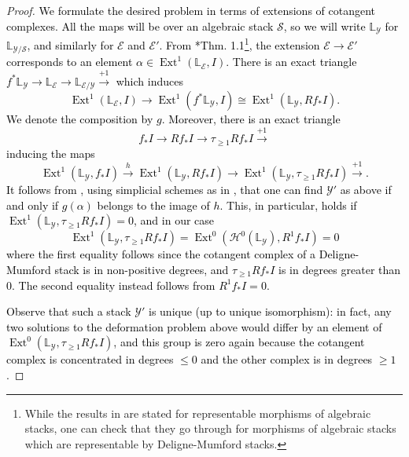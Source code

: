 \documentclass{amsart}
\newcommand{\bL}{\mathbb{L}}
\newcommand{\cE}{\mathcal{E}}
\newcommand{\cH}{\mathcal{H}}
\newcommand{\cS}{\mathcal{S}}
\newcommand{\cY}{\mathcal{Y}}
\newcommand{\E}{\operatorname{Ext}}
\theoremstyle{definition}
\begin{document}
\begin{proof}%
\textcolor{black}{ We formulate the desired problem in terms of extensions of cotangent complexes. All the maps will be over an algebraic stack $\cS$, so we will write $\bL_\cY$ for $\bL_{\cY/\cS}$, and similarly for $\cE$ and $\cE'$. From \cite{ols06}*{Thm. 1.1}\footnote{While the results in \cite{ols06} are stated for representable morphisms of algebraic stacks, one can check that they go through for morphisms of algebraic stacks which are representable by Deligne-Mumford stacks.},
the extension $\cE\to \cE'$ corresponds to an element $\alpha\in\E^1(\bL_{\cE}, I).$ There is an exact triangle 
     $f^*\bL_{\cY}\to \bL_{\cE}\to \bL_{\cE/\cY}\xrightarrow{+1}$
     which induces
     $$\E^1(\bL_{\cE},I)\to \E^1(f^*\bL_{\cY},I)\cong \E^1(\bL_{\cY},Rf_*I). $$}
     \textcolor{black}{We denote the composition by $g$.
        Moreover, there is an exact triangle
    $$f_*I\to Rf_*I\to \tau_{\ge 1} Rf_*I\xrightarrow{+1}$$}
    \textcolor{black}{inducing the maps
    $$\E^1(\bL_{\cY},  f_*I)\xrightarrow{h} \E^1(\bL_{\cY},Rf_*I)\to \E^1(\bL_{\cY},\tau_{\ge 1} Rf_*I)\xrightarrow{+1}.$$
     It follows from \cite[III.2.2.1]{illusie2006complexe}, using simplicial schemes as in \cite{ols06}, that one can find $\cY'$ as above if and only if $g(\alpha)$ belongs to the image of $h$. This, in particular, holds if $\E^1(\bL_{\cY},\tau_{\ge 1} Rf_*I)=0$, and in our case
     $$\E^1(\bL_{\cY},\tau_{\ge 1} Rf_*I) = \E^0(\cH^0(\bL_{\cY}),R^1f_*I) = 0$$
     where the first equality follows since the cotangent complex of a Deligne-Mumford stack is in non-positive degrees, and $\tau_{\ge 1} Rf_*I$ is in degrees greater than 0. The second equality instead follows from $R^1f_*I=0$.}

    \textcolor{black}{Observe that such a stack $\cY'$ is unique (up to unique isomorphism): in fact, any two solutions to the deformation problem above would differ by an element of $\E^0(\bL_{\cY},\tau_{\ge 1} Rf_*I)$, and this group is zero again because the cotangent complex is concentrated in degrees $\leq 0$ and the other complex is in degrees $\geq 1$.}
    

\end{proof}
\end{document}
